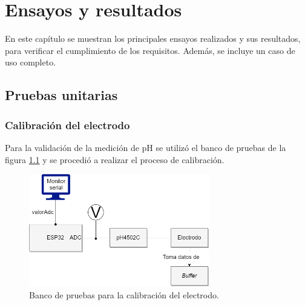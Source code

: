 
\chapter{Ensayos y resultados} %

\label{Chapter4} %

En este capítulo se muestran los principales ensayos realizados y sus resultados, para verificar el cumplimiento de los requisitos. Además, se incluye un caso de uso completo.


\section{Pruebas unitarias}
\label{sec:pruebasUnitarias}

\subsection{Calibración del electrodo}

Para la validación de la medición de pH se utilizó el banco de pruebas de la figura \ref{fig:bancoPruebasCalibracion} y se procedió a realizar el proceso de calibración.

\begin{figure}[htbp]
	\centering
	\includegraphics[width=0.7\textwidth]{./Figures/bancoPruebasCalibracion.png}
	\caption{Banco de pruebas para la calibración del electrodo.}
	\label{fig:bancoPruebasCalibracion}
\end{figure}

